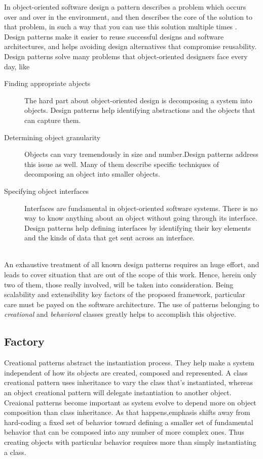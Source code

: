 In object-oriented software design a pattern describes a problem which occurs over and over in the environment, and then describes the core of the solution to that problem, in such a way that you can use this solution multiple times \citep{vlissides1995design}. Design patterns make it easier to reuse successful designs and software architectures, and helps avoiding design alternatives that compromise reusability.
\noindent
\\
Design patterns solve many problems that object-oriented designers face every day, like
\begin{description}
\item[Finding appropriate abjects] The hard part about object-oriented design is decomposing a system into objects. Design patterns help identifying abstractions and the objects that can capture them.
\item[Determining object granularity] Objects can vary tremendously in size and number.Design patterns address this issue as well. Many of them describe specific techniques of decomposing an object into smaller objects.
\item[Specifying object interfaces] Interfaces are fundamental in object-oriented software systems. There is no way to know anything about an object without going through its interface. Design patterns help defining interfaces by identifying their key elements and the kinds of data that get sent across an interface.
\end{description}
\noindent
\\
An exhaustive treatment of all known design patterns requires an huge effort, and leads to cover situation that are out of the scope of this work. Hence, herein only two of them, those really involved, will be taken into consideration. Being scalability and extensibility key factors of the proposed framework, particular care must be payed on the software architecture. The use of patterns belonging to \textit{creational} and \textit{behavioral} classes greatly helps to accomplish this objective. 

\subsection{Factory}

Creational patterns abstract the instantiation process. They help make a system independent of how its objects are created, composed and represented. A class creational pattern uses inheritance to vary the class that's instantiated, whereas an object creational pattern will delegate instantiation to another object. Creaional patterns become important as system evolve to depend more on object composition than class inheritance. As that happens,emphasis shifts away from hard-coding a fixed set of behavior toward defining a smaller set of fundamental behavior that can be composed into any number of more complex ones. Thus creating objects with particular behavior requires more than simply instantiating a class.
